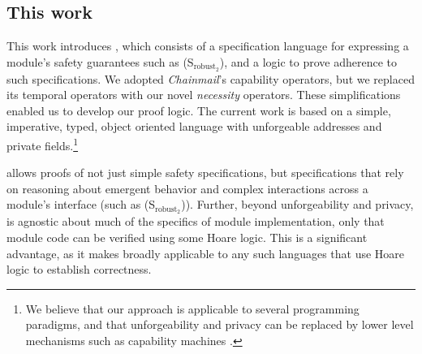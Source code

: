 {\subsection{This work}
This work introduces \Nec, which consists of a specification language for expressing a module's safety guarantees such as (S$_{\text{robust}_2}$), and a logic 
to prove adherence to such specifications.
We adopted %
\emph{Chainmail}'s %
  capability operators, 
but we replaced its temporal operators with  {our novel}
  \emph{necessity} operators. 
  These simplifications enabled us to develop our proof logic. 
The current work is based on a simple, imperative, typed, object oriented
language with unforgeable addresses and private fields.\footnote{We believe
 that our approach is applicable to several programming paradigms, and 
 that   unforgeability and privacy
 can be replaced 
 by lower level mechanisms such as capability machines \cite{vanproving,davis2019cheriabi}.
  }

 \Nec allows proofs of not just simple safety 
specifications, but specifications that rely on reasoning about emergent behavior and complex interactions 
across a module's interface (such as (S$_{\text{robust}_2}$)).
Further, beyond unforgeability and privacy, \Nec is agnostic about much of the specifics
of module implementation, only that module code can be verified using some Hoare logic. This is a significant advantage, as it makes \Nec broadly applicable to any such languages that use Hoare logic to establish correctness.


}
